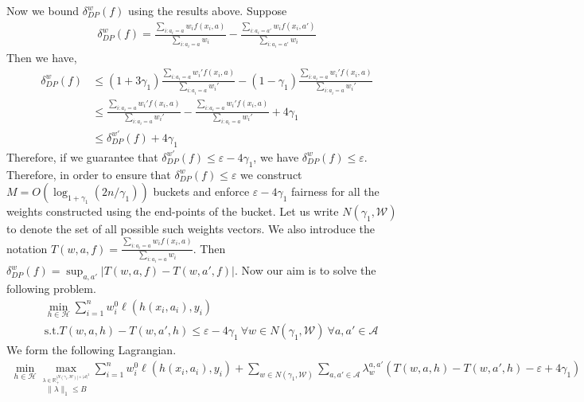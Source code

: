 \documentclass[11pt]{article}
\newcommand{\bbR}{\mathbb{R}}
\newcommand{\WW}{\mathcal{W}}
\newcommand{\abs}[1]{\left|#1\right|}
\newcommand{\Ac}{\mathcal{A}}
\newcommand{\HH}{\mathcal{H}}
\newcommand{\eps}{\varepsilon}
\newcommand{\norm}[1]{\lVert #1 \rVert}
\begin{document}
Now we bound $\delta^w_{DP}(f)$ using the results above. Suppose
\begin{align*}
\delta^w_{DP}(f) = \frac{\sum_{i: a_i = a} w_i f(x_i,a)}{\sum_{i: a_i = a} w_i} -  \frac{\sum_{i: a_i = a'} w_i f(x_i,a')}{\sum_{i: a_i = a'} w_i}
\end{align*}
Then we have,
\begin{align*}
\delta^w_{DP}(f) &\le (1+3\gamma_1)  \frac{\sum_{i: a_i = a} w_i' f(x_i,a)}{\sum_{i: a_i = a} w_i'} - (1-\gamma_1) \frac{\sum_{i: a_i = a} w_i' f(x_i,a)}{\sum_{i: a_i = a} w_i'}  \\
&\le  \frac{\sum_{i: a_i = a} w_i' f(x_i,a)}{\sum_{i: a_i = a} w_i'} -  \frac{\sum_{i: a_i = a} w_i' f(x_i,a)}{\sum_{i: a_i = a} w_i'} + 4\gamma_1\\
&\le \delta^{w'}_{DP}(f) + 4\gamma_1
\end{align*}
Therefore, if we guarantee that $\delta^{w'}_{DP}(f) \le \eps -4\gamma_1$, we have $\delta^w_{DP}(f) \le \eps$. Therefore, in order to ensure that $\delta^w_{DP}(f) \le \eps$ we construct $M = O(\log_{1+\gamma_1}(2n/\gamma_1) )$ buckets and enforce $\eps-4\gamma_1$ fairness for all the weights constructed using the end-points of the bucket. Let us write $N(\gamma_1,\WW)$ to denote the set of all possible such weights vectors. We also introduce the notation $T(w,a,f) = \frac{\sum_{i: a_i = a} w_i f(x_i,a)}{\sum_{i: a_i = a} w_i}$. Then $\delta^w_{DP}(f) = \sup_{a,a'}\abs{T(w,a,f) - T(w,a',f)}$. Now our aim is to solve the following problem.
\begin{align}
&\min_{h \in \HH} \sum_{i=1}^n w^0_i \ell(h(x_i,a_i),y_i)\label{eq:final-objective}\\
&\text{s.t.} T(w,a,h) - T(w,a',h) \le \eps - 4\gamma_1\ \forall w \in N(\gamma_1,\WW) \ \forall a,a' \in \Ac \nonumber
\end{align}
We form the following Lagrangian.
\begin{align}\label{eq:lagrangian}
\min_{h \in \HH} \max_{\stackrel{\lambda \in \bbR^{\abs{N(\gamma_1,\WW)} \times \abs{\Ac}^2}_+}{ \norm{\lambda}_1 \le B} } \sum_{i=1}^n w^0_i \ell(h(x_i,a_i),y_i) + \sum_{w \in N(\gamma_1,\WW)} \sum_{a,a' \in \Ac} \lambda_w^{a,a'} ( T(w,a,h) - T(w,a',h) - \eps + 4\gamma_1)
\end{align}
\end{document}
